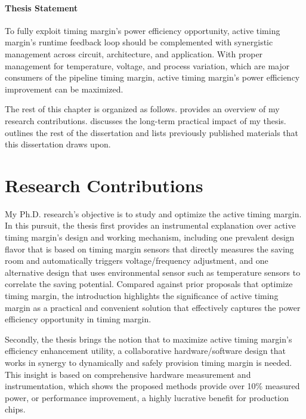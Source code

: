\paragraph{Thesis Statement} To fully exploit timing margin’s power efficiency opportunity, active timing margin’s runtime feedback loop should be complemented with synergistic management across circuit, architecture, and application. With proper management for temperature, voltage, and process variation, which are major consumers of the pipeline timing margin, active timing margin’s power efficiency improvement can be maximized.

The rest of this chapter is organized as follows.  provides an overview of my research contributions.  discusses the long-term practical impact of my thesis.  outlines the rest of the dissertation and  lists previously published materials that this dissertation draws upon.

\section{Research Contributions}
\label{sec:intro:work}

My Ph.D. research's objective is to study and optimize the active timing margin. In this pursuit, the thesis first provides an instrumental explanation over active timing margin's design and working mechanism, including one prevalent design flavor that is based on timing margin sensors that directly measures the saving room and automatically triggers voltage/frequency adjustment, and one alternative design that uses environmental sensor such as temperature sensors to correlate the saving potential. Compared against prior proposals that optimize timing margin, the introduction highlights the significance of active timing margin as a practical and convenient solution that effectively captures the power efficiency opportunity in timing margin.


Secondly, the thesis brings the notion that to maximize active timing margin's efficiency enhancement utility, a collaborative hardware/software design that works in synergy to dynamically and safely provision timing margin is needed. This insight is based on comprehensive hardware measurement and instrumentation, which shows the proposed methods provide over 10\% measured power, or performance improvement, a highly lucrative benefit for production chips.

